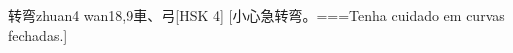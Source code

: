 \begin{EntryWithPhonetic}{转弯}{zhuan4 wan1}{8,9}{⾞、⼸}[HSK 4]
  [小心急转弯。===Tenha cuidado em curvas fechadas.]
\end{EntryWithPhonetic}


